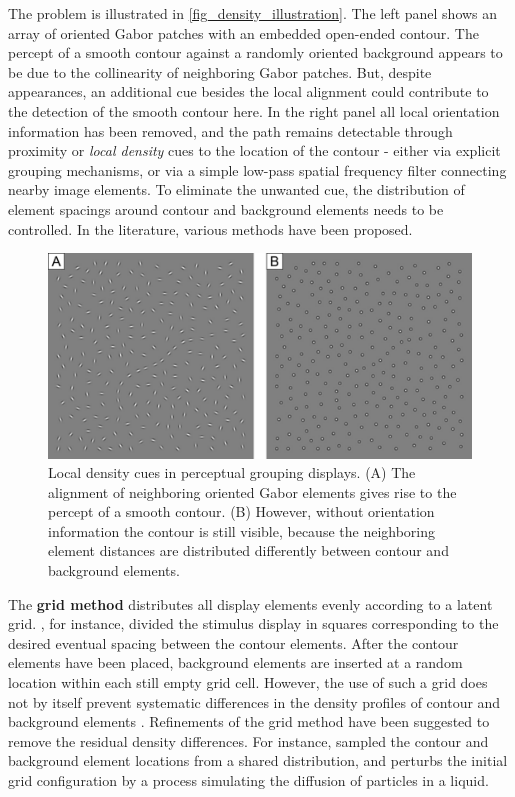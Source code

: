 \documentclass[12pt]{article}
\begin{document}
The problem is illustrated in \autoref{fig_density_illustration}. The left panel shows an array of oriented Gabor patches with an embedded open-ended contour. The percept of a smooth contour against a randomly oriented background appears to be due to the collinearity of neighboring Gabor patches. But, despite appearances, an additional cue besides the local alignment could contribute to the detection of the smooth contour here. In the right panel all local orientation information has been removed, and the path remains detectable through proximity or \emph{local density} cues to the location of the contour - either via explicit grouping mechanisms, or via a simple low-pass spatial frequency filter connecting nearby image elements. To eliminate the unwanted cue, the distribution of element spacings around contour and background elements needs to be controlled. In the literature, various methods have been proposed.\\

\begin{figure}[h]
\includegraphics{Figures/FIG_density_illustration.png}
\caption{Local density cues in perceptual grouping displays. (A) The alignment of neighboring oriented Gabor elements gives rise to the percept of a smooth contour. (B) However, without orientation information the contour is still visible, because the neighboring element distances are distributed differently between contour and background elements.}
\label{fig_density_illustration}
\end{figure}

The \textbf{grid method} distributes all display elements evenly according to a latent grid. , for instance, divided the stimulus display in squares corresponding to the desired eventual spacing between the contour elements. After the contour elements have been placed, background elements are inserted at a random location within each still empty grid cell. However, the use of such a grid does not by itself prevent systematic differences in the density profiles of contour and background elements \cite{Braun99}. Refinements of the grid method have been suggested to remove the residual density differences. For instance,  sampled the contour and background element locations from a shared distribution, and  perturbs the initial grid configuration by a process simulating the diffusion of particles in a liquid.\\
\end{document}
